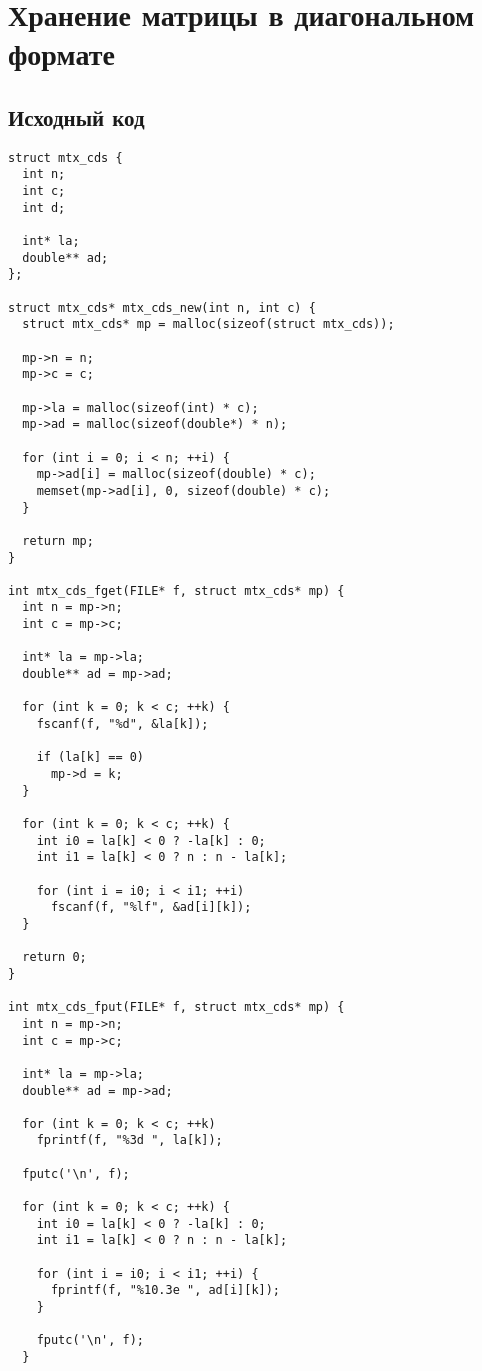 \documentclass[12pt, a4paper]{article}
\begin{document}
\section{Хранение матрицы в диагональном формате}
\subsection{Исходный код}

\begin{verbatim}
struct mtx_cds {
  int n;
  int c;
  int d;

  int* la;
  double** ad;
};

struct mtx_cds* mtx_cds_new(int n, int c) {
  struct mtx_cds* mp = malloc(sizeof(struct mtx_cds));

  mp->n = n;
  mp->c = c;

  mp->la = malloc(sizeof(int) * c);
  mp->ad = malloc(sizeof(double*) * n);

  for (int i = 0; i < n; ++i) {
    mp->ad[i] = malloc(sizeof(double) * c);
    memset(mp->ad[i], 0, sizeof(double) * c);
  }

  return mp;
}

int mtx_cds_fget(FILE* f, struct mtx_cds* mp) {
  int n = mp->n;
  int c = mp->c;

  int* la = mp->la;
  double** ad = mp->ad;

  for (int k = 0; k < c; ++k) {
    fscanf(f, "%d", &la[k]);

    if (la[k] == 0)
      mp->d = k;
  }

  for (int k = 0; k < c; ++k) {
    int i0 = la[k] < 0 ? -la[k] : 0;
    int i1 = la[k] < 0 ? n : n - la[k];

    for (int i = i0; i < i1; ++i)
      fscanf(f, "%lf", &ad[i][k]);
  }

  return 0;
}

int mtx_cds_fput(FILE* f, struct mtx_cds* mp) {
  int n = mp->n;
  int c = mp->c;

  int* la = mp->la;
  double** ad = mp->ad;

  for (int k = 0; k < c; ++k)
    fprintf(f, "%3d ", la[k]);

  fputc('\n', f);

  for (int k = 0; k < c; ++k) {
    int i0 = la[k] < 0 ? -la[k] : 0;
    int i1 = la[k] < 0 ? n : n - la[k];

    for (int i = i0; i < i1; ++i) {
      fprintf(f, "%10.3e ", ad[i][k]);
    }

    fputc('\n', f);
  }


\end{verbatim}
\end{document}
